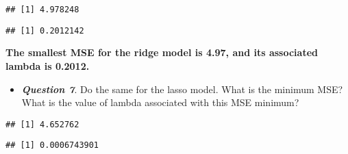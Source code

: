\documentclass[
]{article}
\newenvironment{Shaded}{\begin{snugshade}}{\end{snugshade}}
\newcommand{\CommentTok}[1]{\textcolor[rgb]{0.56,0.35,0.01}{\textit{#1}}}
\newcommand{\FunctionTok}[1]{\textcolor[rgb]{0.00,0.00,0.00}{#1}}
\newcommand{\NormalTok}[1]{#1}
\newcommand{\SpecialCharTok}[1]{\textcolor[rgb]{0.00,0.00,0.00}{#1}}
\providecommand{\tightlist}{%
  \setlength{\itemsep}{0pt}\setlength{\parskip}{0pt}}
\begin{document}
\begin{Shaded}
\end{Shaded}

\begin{verbatim}
## [1] 4.978248
\end{verbatim}

\begin{Shaded}
\end{Shaded}

\begin{verbatim}
## [1] 0.2012142
\end{verbatim}

\textbf{The smallest MSE for the ridge model is 4.97, and its associated
lambda is 0.2012.}

\begin{itemize}
\tightlist
\item
  \textbf{\emph{Question 7}}. Do the same for the lasso model. What is
  the minimum MSE? What is the value of lambda associated with this MSE
  minimum?
\end{itemize}

\begin{Shaded}
\end{Shaded}

\begin{verbatim}
## [1] 4.652762
\end{verbatim}

\begin{Shaded}
\end{Shaded}

\begin{verbatim}
## [1] 0.0006743901
\end{verbatim}
\end{document}

